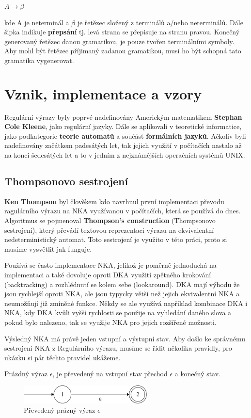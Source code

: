 $A \longrightarrow \beta$

\noindent 
kde A je neterminál a $\beta$ je řetězec složený z terminálů a/nebo neterminálů. 
Dále šipka indikuje \textbf{přepsání} tj. levá strana se přepisuje na stranu pravou.
Konečný generovaný řetězec danou gramatikou, je pouze tvořen terminálními symboly.
Aby mohl být řetězec příjimaný zadanou gramatikou, musí ho být schopná tato gramatika vygenerovat.

\section{Vznik, implementace a vzory}
Regulární výrazy byly poprvé nadefinovány Americkým matematikem \textbf{Stephan Cole Kleene}, jako regulární jazyky. 
Dále se aplikovali v teoretické informatice, jako podkategorie \textbf{teorie automatů} a součást \textbf{formálních jazyků}.
Ačkoliv byli nadefinovány začátkem padesátých let, tak jejich využití v počítačích nastalo až na konci šedesátých let a to v 
jedním z nejznámějších operačních systémů UNIX.

\subsection*{Thompsonovo sestrojení}

\textbf{Ken Thompson} byl člověkem kdo navrhnul první implementaci převodu ragulárního výrazu na NKA využívanou v počítačích, která se používá do dnes. 
Algoritmus se pojmenoval \textbf{Thompson's construction} (Thompsonovo sestrojení), který převádí textovou reprezentaci výrazu na ekvivalentní nedeterministický automat.
Toto sestrojení je využito v této práci, proto si musíme vysvětlit jak funguje.

Používá se často implementace NKA, jelikož je poměrně jednoduchá na implementaci a
také dovoluje oproti DKA využití zpětného krokování (backtracking) a rozhlédnutí se kolem sebe (lookaround).
DKA mají výhodu že jsou rychlejší oproti NKA, ale jsou typycky větší než jejich ekvivalentní NKA a neumožňují již zmíněné funkce. 
Někdy se ale využívá například kombinace DKA i NKA, kdy DKA kvůli vyšší rychlosti se použije na vyhledání daného slova a pokud bylo nalezeno, 
tak se využije NKA pro jejich rozšířené možnosti.

Výsledný NKA má právě jeden vstupní a výstupní stav. Aby došlo ke správnému sestrojení NKA z Regulárního výrazu, musíme se řídit několika pravidly, pro ukázku si pár těchto pravidel ukážeme.

Prázdný výraz \textit{$\epsilon$}, je převedený na vstupní stav přechod \textit{$\epsilon$} a konečný stav.
\begin{figure}[!h]
	\centering
	\includegraphics[width=0.6\textwidth]{Figures/NFA_epsilon.pdf}
	\caption{Převedený prázný výraz \textbf{$\epsilon$}}
	\label{fig:NFAepsilon}
\end{figure}


